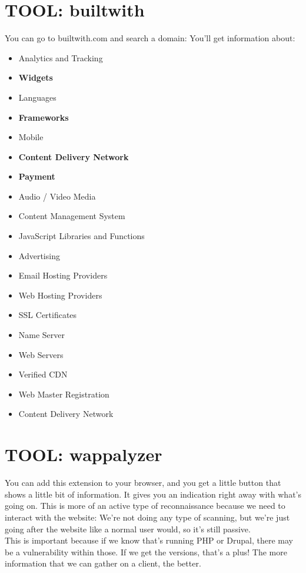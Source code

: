 \documentclass[11pt,a4paper]{article}
\begin{document}
\section{TOOL: builtwith}
You can go to builtwith.com and search a domain: You'll get information about:
\begin{multicols}{2}
\begin{itemize}
\item Analytics and Tracking
\item \textbf{Widgets}
\item Languages
\item \textbf{Frameworks}
\item Mobile
\item \textbf{Content Delivery Network}
\item \textbf{Payment}
\item Audio / Video Media
\item Content Management System
\item JavaScript Libraries and Functions
\item Advertising
\item Email Hosting Providers
\item Web Hosting Providers
\item SSL Certificates
\item Name Server
\item Web Servers
\item Verified CDN
\item Web Master Registration
\item Content Delivery Network
\end{itemize}
\end{multicols}

\section{TOOL: wappalyzer}
You can add this extension to your browser, and you get a little button that shows a little bit of information. It gives you an indication right away with what's going on. This is more of an active type of reconnaissance because we need to interact with the website: We're not doing any type of scanning, but we're just going after the website like a normal user would, so it's still passive.\\

This is important because if we know that's running PHP or Drupal, there may be a vulnerability within those. If we get the versions, that's a plus! The more information that we can gather on a client, the better.
\end{document}
